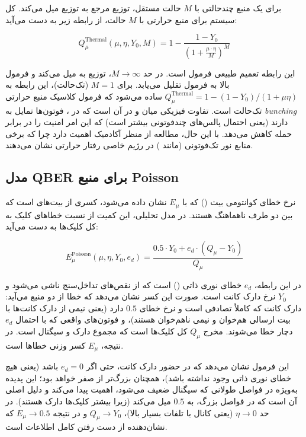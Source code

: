 برای یک منبع چندحالتی با $M$ حالت مستقل، توزیع مرجع به توزیع  میل می‌کند.  کل سیستم برای منبع حرارتی با $M$ حالت، از رابطه زیر به دست می‌آید:

\begin{equation}
	Q_\mu^{\text{Thermal}}(\mu, \eta, Y_0, M) = 1 - \frac{1 - Y_0}{\left(1 + \frac{\mu \cdot \eta}{M}\right)^M}
\end{equation}

این رابطه تعمیم طبیعی فرمول  است. در حد $M \to \infty$، توزیع  به  میل می‌کند و فرمول بالا به فرمول  تقلیل می‌یابد. برای $M = 1$ (تک‌حالت)، این رابطه به $Q_\mu^{\text{Thermal}} = 1 - (1-Y_0)/(1+\mu \eta)$ ساده می‌شود که فرمول کلاسیک منبع حرارتی تک‌حالت است. تفاوت فیزیکی میان  و  در آن است که در ، فوتون‌ها تمایل به \emph{bunching} دارند (یعنی احتمال پالس‌های چندفوتونی بیشتر است) که این امر امنیت را در برابر حمله  کاهش می‌دهد. با این حال، مطالعه  از منظر آکادمیک اهمیت دارد چرا که برخی منابع نور تک‌فوتونی (مانند ) در رژیم خاصی رفتار حرارتی نشان می‌دهند.

\subsection{مدل QBER برای منبع Poisson}

نرخ خطای کوانتومی بیت () که با $E_\mu$ نشان داده می‌شود، کسری از بیت‌های  است که بین دو طرف ناهماهنگ هستند. در مدل تحلیلی، این کمیت از نسبت خطاهای کلیک به کل کلیک‌ها به دست می‌آید:

\begin{equation}
	E_\mu^{\text{Poisson}}(\mu, \eta, Y_0, e_d) = \frac{0.5 \cdot Y_0 + e_d \cdot (Q_\mu - Y_0)}{Q_\mu}
\end{equation}

در این رابطه، $e_d$ خطای نوری ذاتی () است که از نقص‌های تداخل‌سنج ناشی می‌شود و $Y_0$ نرخ دارک کانت است. صورت این کسر نشان می‌دهد که خطا از دو منبع می‌آید: دارک کانت که کاملاً تصادفی است و نرخ خطای $0.5$ دارد (یعنی نیمی از دارک کانت‌ها با بیت ارسالی هم‌خوان و نیمی ناهم‌خوان هستند)، و فوتون‌های واقعی که با احتمال $e_d$ دچار خطا می‌شوند. مخرج $Q_\mu$ کل کلیک‌ها است که مجموع دارک و سیگنال است. در نتیجه، $E_\mu$ کسر وزنی خطاها است.

این فرمول نشان می‌دهد که در حضور دارک کانت، حتی اگر $e_d = 0$ باشد (یعنی هیچ خطای نوری ذاتی وجود نداشته باشد)،  همچنان بزرگ‌تر از صفر خواهد بود؛ این پدیده به‌ویژه در فواصل طولانی که سیگنال ضعیف می‌شود، اهمیت پیدا می‌کند و دلیل اصلی آن است که در فواصل بزرگ،  به $0.5$ میل می‌کند (زیرا بیشتر کلیک‌ها دارک هستند). در حد $\eta \to 0$ (یعنی کانال با تلفات بسیار بالا)، $Q_\mu \to Y_0$ و در نتیجه $E_\mu \to 0.5$ که نشان‌دهنده از دست رفتن کامل اطلاعات است.

